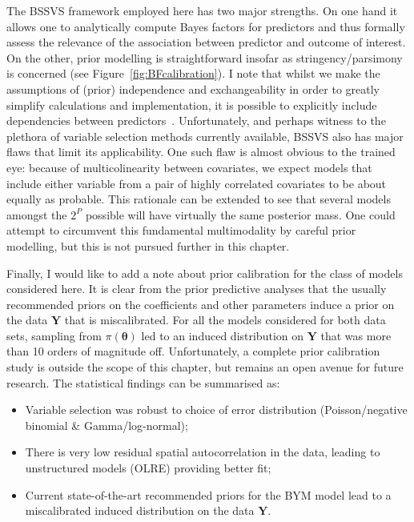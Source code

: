 The BSSVS framework employed here has two major strengths.
On one hand it allows one to analytically compute Bayes factors for predictors and thus formally assess the relevance of the association between predictor and outcome of interest.
On the other, prior modelling is straightforward insofar as stringency/parsimony is concerned (see Figure~\ref{fig:BFcalibration}).
I note that whilst we make the assumptions of (prior) independence and exchangeability  in order to greatly simplify calculations and implementation, it is possible to explicitly include dependencies between predictors~\citep{Chipman1996}.
Unfortunately, and perhaps witness to the plethora of variable selection methods currently available, BSSVS also has major flaws that limit its applicability.
One such flaw is almost obvious to the trained  eye: because of multicolinearity between covariates, we expect models that include either variable from a pair of highly correlated covariates to be about equally as probable.
This rationale can be extended to see that several models amongst the $2^P$ possible will have virtually the same posterior mass. 
One could attempt to circumvent this fundamental multimodality by careful prior modelling, but this is not pursued further in this chapter. 

Finally, I would like to add a note about prior calibration for the class of models considered here.
It is clear from the prior predictive analyses that the usually recommended priors on the coefficients and other parameters induce a prior on the data $\boldsymbol Y$ that is miscalibrated.
For all the models considered for both data sets, sampling from $\pi(\boldsymbol\theta)$ led to an induced distribution  on $\boldsymbol Y$ that was more than 10 orders of magnitude off.
Unfortunately, a complete prior calibration study is outside the scope of this chapter, but remains an open avenue for future research.
% 
The statistical findings can be summarised as:
\begin{itemize}
 \item Variable selection was robust to choice of error distribution (Poisson/negative binomial \& Gamma/log-normal);
 \item There is very low residual spatial autocorrelation in the data, leading to unstructured models (OLRE) providing better fit;
 \item Current state-of-the-art recommended priors for the BYM model lead to a miscalibrated induced distribution on the data $\boldsymbol Y$.
\end{itemize}


